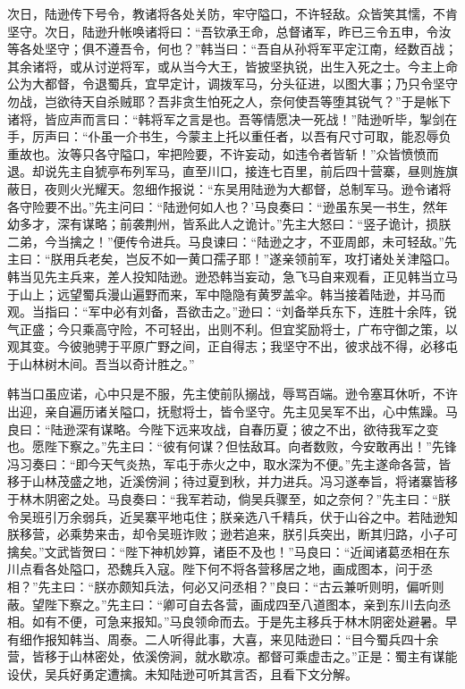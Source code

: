 次日，陆逊传下号令，教诸将各处关防，牢守隘口，不许轻敌。众皆笑其懦，不肯坚守。次日，陆逊升帐唤诸将曰：“吾钦承王命，总督诸军，昨已三令五申，令汝等各处坚守；俱不遵吾令，何也？”韩当曰：“吾自从孙将军平定江南，经数百战；其余诸将，或从讨逆将军，或从当今大王，皆披坚执锐，出生入死之士。今主上命公为大都督，令退蜀兵，宜早定计，调拨军马，分头征进，以图大事；乃只令坚守勿战，岂欲待天自杀贼耶？吾非贪生怕死之人，奈何使吾等堕其锐气？”于是帐下诸将，皆应声而言曰：“韩将军之言是也。吾等情愿决一死战！”陆逊听毕，掣剑在手，厉声曰：“仆虽一介书生，今蒙主上托以重任者，以吾有尺寸可取，能忍辱负重故也。汝等只各守隘口，牢把险要，不许妄动，如违令者皆斩！”众皆愤愤而退。却说先主自猇亭布列军马，直至川口，接连七百里，前后四十营寨，昼则旌旗蔽日，夜则火光耀天。忽细作报说：“东吴用陆逊为大都督，总制军马。逊令诸将各守险要不出。”先主问曰：“陆逊何如人也？’马良奏曰：“逊虽东吴一书生，然年幼多才，深有谋略；前袭荆州，皆系此人之诡计。”先主大怒曰：“竖子诡计，损朕二弟，今当擒之！”便传令进兵。马良谏曰：“陆逊之才，不亚周郎，未可轻敌。”先主曰：“朕用兵老矣，岂反不如一黄口孺子耶！”遂亲领前军，攻打诸处关津隘口。韩当见先主兵来，差人投知陆逊。逊恐韩当妄动，急飞马自来观看，正见韩当立马于山上；远望蜀兵漫山遍野而来，军中隐隐有黄罗盖伞。韩当接着陆逊，并马而观。当指曰：“军中必有刘备，吾欲击之。”逊曰：“刘备举兵东下，连胜十余阵，锐气正盛；今只乘高守险，不可轻出，出则不利。但宜奖励将士，广布守御之策，以观其变。今彼驰骋于平原广野之间，正自得志；我坚守不出，彼求战不得，必移屯于山林树木间。吾当以奇计胜之。”

韩当口虽应诺，心中只是不服，先主使前队搦战，辱骂百端。逊令塞耳休听，不许出迎，亲自遍历诸关隘口，抚慰将士，皆令坚守。先主见吴军不出，心中焦躁。马良曰：“陆逊深有谋略。今陛下远来攻战，自春历夏；彼之不出，欲待我军之变也。愿陛下察之。”先主曰：“彼有何谋？但怯敌耳。向者数败，今安敢再出！”先锋冯习奏曰：“即今天气炎热，军屯于赤火之中，取水深为不便。”先主遂命各营，皆移于山林茂盛之地，近溪傍涧；待过夏到秋，并力进兵。冯习遂奉旨，将诸寨皆移于林木阴密之处。马良奏曰：“我军若动，倘吴兵骤至，如之奈何？”先主曰：“朕令吴班引万余弱兵，近吴寨平地屯住；朕亲选八千精兵，伏于山谷之中。若陆逊知朕移营，必乘势来击，却令吴班诈败；逊若追来，朕引兵突出，断其归路，小子可擒矣。”文武皆贺曰：“陛下神机妙算，诸臣不及也！”马良曰：“近闻诸葛丞相在东川点看各处隘口，恐魏兵入寇。陛下何不将各营移居之地，画成图本，问于丞相？”先主曰：“朕亦颇知兵法，何必又问丞相？”良曰：“古云兼听则明，偏听则蔽。望陛下察之。”先主曰：“卿可自去各营，画成四至八道图本，亲到东川去向丞相。如有不便，可急来报知。”马良领命而去。于是先主移兵于林木阴密处避暑。早有细作报知韩当、周泰。二人听得此事，大喜，来见陆逊曰：“目今蜀兵四十余营，皆移于山林密处，依溪傍涧，就水歇凉。都督可乘虚击之。”正是：蜀主有谋能设伏，吴兵好勇定遭擒。未知陆逊可听其言否，且看下文分解。